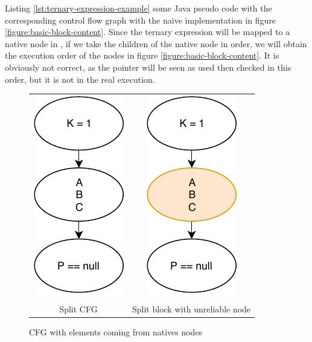 Listing \ref{lst:ternary-expression-example} some Java pseudo code with the corresponding control flow graph with the naive implementation in figure \ref{figure:basic-block-content}.
Since the ternary expression will be mapped to a native node in \slang{}, if we take the children of the native node in order, we will obtain the execution order of the nodes in figure \ref{figure:basic-block-content}.
It is obviously not correct, as the pointer will be seen as used then checked in this order, but it is not in the real execution.

\begin{figure}[h]
	\caption{CFG with elements coming from natives nodes}
	\label{figure:two-unreliable-cfg}
	\setlength{\tabcolsep}{24pt}
	\begin{tabular}{cc}
		\includegraphics[]{figure/unreliable-cfg-1.pdf}  &
		\includegraphics[]{figure/unreliable-cfg-2.pdf}   \\ 
		Split CFG & Split block with unreliable node
	\end{tabular}
\end{figure}

